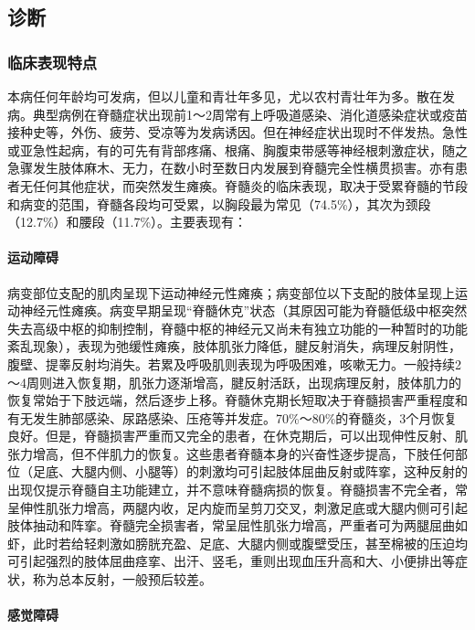 \subsection{诊断}

\subsubsection{临床表现特点}

本病任何年龄均可发病，但以儿童和青壮年多见，尤以农村青壮年为多。散在发病。典型病例在脊髓症状出现前1～2周常有上呼吸道感染、消化道感染症状或疫苗接种史等，外伤、疲劳、受凉等为发病诱因。但在神经症状出现时不伴发热。急性或亚急性起病，有的可先有背部疼痛、根痛、胸腹束带感等神经根刺激症状，随之急骤发生肢体麻木、无力，在数小时至数日内发展到脊髓完全性横贯损害。亦有患者无任何其他症状，而突然发生瘫痪。脊髓炎的临床表现，取决于受累脊髓的节段和病变的范围，脊髓各段均可受累，以胸段最为常见（74.5\%），其次为颈段（12.7\%）和腰段（11.7\%）。主要表现有：

\paragraph{运动障碍}

病变部位支配的肌肉呈现下运动神经元性瘫痪；病变部位以下支配的肢体呈现上运动神经元性瘫痪。病变早期呈现“脊髓休克”状态（其原因可能为脊髓低级中枢突然失去高级中枢的抑制控制，脊髓中枢的神经元又尚未有独立功能的一种暂时的功能紊乱现象），表现为弛缓性瘫痪，肢体肌张力降低，腱反射消失，病理反射阴性，腹壁、提睾反射均消失。若累及呼吸肌则表现为呼吸困难，咳嗽无力。一般持续2～4周则进入恢复期，肌张力逐渐增高，腱反射活跃，出现病理反射，肢体肌力的恢复常始于下肢远端，然后逐步上移。脊髓休克期长短取决于脊髓损害严重程度和有无发生肺部感染、尿路感染、压疮等并发症。70\%～80\%的脊髓炎，3个月恢复良好。但是，脊髓损害严重而又完全的患者，在休克期后，可以出现伸性反射、肌张力增高，但不伴肌力的恢复。这些患者脊髓本身的兴奋性逐步提高，下肢任何部位（足底、大腿内侧、小腿等）的刺激均可引起肢体屈曲反射或阵挛，这种反射的出现仅提示脊髓自主功能建立，并不意味脊髓病损的恢复。脊髓损害不完全者，常呈伸性肌张力增高，两腿内收，足内旋而呈剪刀交叉，刺激足底或大腿内侧可引起肢体抽动和阵挛。脊髓完全损害者，常呈屈性肌张力增高，严重者可为两腿屈曲如虾，此时若给轻刺激如膀胱充盈、足底、大腿内侧或腹壁受压，甚至棉被的压迫均可引起强烈的肢体屈曲痉挛、出汗、竖毛，重则出现血压升高和大、小便排出等症状，称为总本反射，一般预后较差。

\paragraph{感觉障碍}

